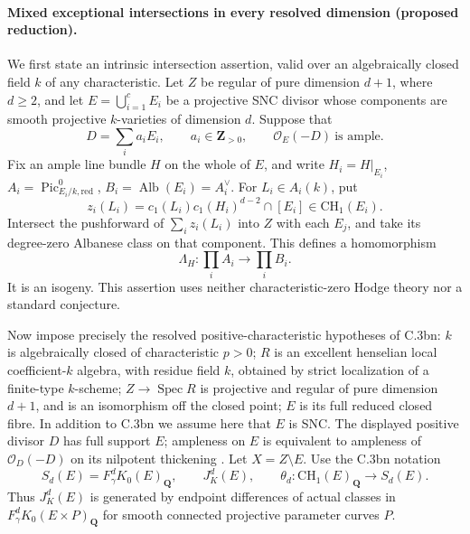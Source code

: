 \paragraph{Mixed exceptional intersections in every resolved dimension
(proposed reduction).}
We first state an intrinsic intersection assertion, valid over an
algebraically closed field $k$ of any characteristic.
Let $Z$ be regular of pure dimension $d+1$, where $d\ge2$, and let
$E=\bigcup_{i=1}^cE_i$ be a projective SNC divisor whose components
are smooth projective $k$-varieties of dimension $d$.
Suppose that
\[
 D=\sum_i a_iE_i,\qquad a_i\in\mathbf Z_{>0},\qquad
                         \mathcal O_E(-D)\ \text{is ample}.
\]
Fix an ample line bundle $H$ on the whole of $E$, and write
$H_i=H|_{E_i}$,
$A_i=\operatorname{Pic}^0_{E_i/k,\mathrm{red}}$,
$B_i=\operatorname{Alb}(E_i)=A_i^\vee$.
For $L_i\in A_i(k)$, put
\[
 z_i(L_i)=c_1(L_i)c_1(H_i)^{d-2}\cap[E_i]
                              \in\mathrm{CH}_1(E_i).
\]
Intersect the pushforward of $\sum_i z_i(L_i)$ into $Z$ with each
$E_j$, and take its degree-zero Albanese class on that component.
This defines a homomorphism
\begin{equation}
       \Lambda_H:\prod_iA_i\longrightarrow\prod_iB_i.
                                                        \tag{MA.1}
\end{equation}
It is an isogeny. This assertion uses neither characteristic-zero
Hodge theory nor a standard conjecture.

Now impose precisely the resolved positive-characteristic
hypotheses of C.3bn: $k$ is algebraically closed of characteristic
$p>0$; $R$ is an excellent henselian local coefficient-$k$ algebra,
with residue field $k$, obtained by strict localization of a
finite-type $k$-scheme; $Z\to\operatorname{Spec}R$ is projective
and regular of pure dimension $d+1$, and is an isomorphism off
the closed point; $E$ is its full reduced closed fibre.
In addition to C.3bn we assume here that $E$ is SNC.
The displayed positive divisor $D$ has full support $E$;
ampleness on $E$ is equivalent to ampleness of
$\mathcal O_D(-D)$ on its nilpotent thickening
\citep[Lemma 30.17.5]{rootStacks2026NilpotentAmple}.
Let $X=Z\setminus E$. Use the C.3bn notation
\[
 S_d(E)=F_\gamma^dK_0(E)_{\mathbf Q},\qquad J_K^d(E),\qquad
 \theta_d:\mathrm{CH}_1(E)_{\mathbf Q}\longrightarrow S_d(E).
\]
Thus $J_K^d(E)$ is generated by endpoint differences of actual
classes in $F_\gamma^dK_0(E\times P)_{\mathbf Q}$ for smooth
connected projective parameter curves $P$.


